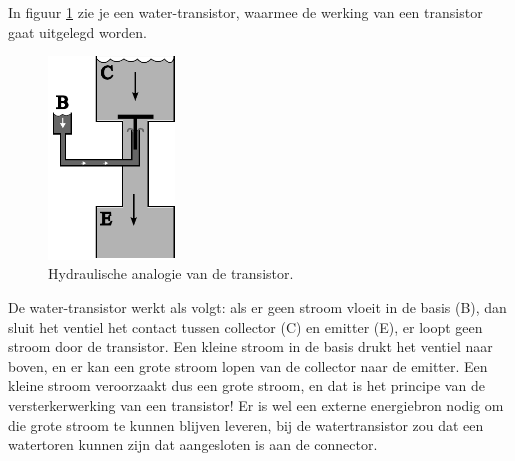 \documentclass{article}
\begin{document}
			In figuur \ref{fig:watertransistor} zie je een water-transistor, waarmee de werking van een transistor gaat uitgelegd worden. \begin{figure}[htbp]
				\centering
				\includegraphics[width=0.3\textwidth]{watertransistor}
				\caption{Hydraulische analogie van de transistor.}
				\label{fig:watertransistor}
			\end{figure}

			De water-transistor werkt als volgt: als er geen stroom vloeit in de basis (B), dan sluit het ventiel het contact tussen collector (C) en emitter (E), er loopt geen stroom door de transistor. Een kleine stroom in de basis drukt het ventiel naar boven, en er kan een grote stroom lopen van de collector naar de emitter. Een kleine stroom veroorzaakt dus een grote stroom, en dat is het principe van de versterkerwerking van een transistor! Er is wel een externe energiebron nodig om die grote stroom te kunnen blijven leveren, bij de watertransistor zou dat een watertoren kunnen zijn dat aangesloten is aan de connector.

			
\end{document}
